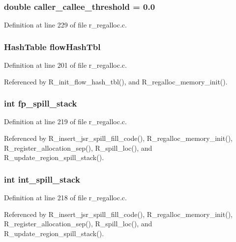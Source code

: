 \subsubsection{\setlength{\rightskip}{0pt plus 5cm}double \bf{caller\_\-callee\_\-threshold} = 0.0}\label{r__regalloc_8c_90604dbb84958d80007fcd56921c7c26}




Definition at line 229 of file r\_\-regalloc.c.
\subsubsection{\setlength{\rightskip}{0pt plus 5cm}\bf{Hash\-Table} \bf{flow\-Hash\-Tbl}}\label{r__regalloc_8c_9c212ddf99ef05a31beb28057eebde4a}




Definition at line 201 of file r\_\-regalloc.c.

Referenced by R\_\-init\_\-flow\_\-hash\_\-tbl(), and R\_\-regalloc\_\-memory\_\-init().
\subsubsection{\setlength{\rightskip}{0pt plus 5cm}int \bf{fp\_\-spill\_\-stack}}\label{r__regalloc_8c_058f50532dbe9ee564bfc6fd53829878}




Definition at line 219 of file r\_\-regalloc.c.

Referenced by R\_\-insert\_\-jsr\_\-spill\_\-fill\_\-code(), R\_\-regalloc\_\-memory\_\-init(), R\_\-register\_\-allocation\_\-sep(), R\_\-spill\_\-loc(), and R\_\-update\_\-region\_\-spill\_\-stack().
\subsubsection{\setlength{\rightskip}{0pt plus 5cm}int \bf{int\_\-spill\_\-stack}}\label{r__regalloc_8c_4cbe8b90de02945ccbcd6b4b0aa4df2e}




Definition at line 218 of file r\_\-regalloc.c.

Referenced by R\_\-insert\_\-jsr\_\-spill\_\-fill\_\-code(), R\_\-regalloc\_\-memory\_\-init(), R\_\-register\_\-allocation\_\-sep(), R\_\-spill\_\-loc(), and R\_\-update\_\-region\_\-spill\_\-stack().
